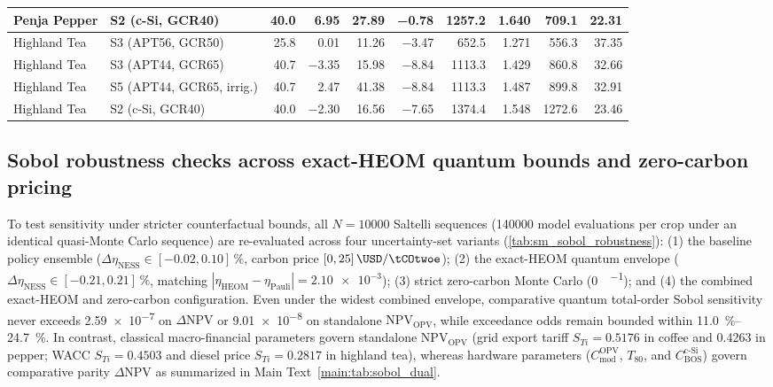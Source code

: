 \documentclass[preprint,12pt,a4paper]{elsarticle}
\begin{document}
\begin{table}[htbp]
{\begin{tabular}{@{}llrrrrrrrr@{}}
 Penja Pepper & S2 (c-Si, GCR40) & \num{40.0} & \num{+6.95} & \num{+27.89} & \num{-0.78} & \num{1257.2} & \num{1.640} & \num{709.1} & \num{22.31} \\
 \midrule
 Highland Tea & S3 (APT56, GCR50) & \num{25.8} & \num{+0.01} & \num{+11.26} & \num{-3.47} & \num{652.5} & \num{1.271} & \num{556.3} & \num{37.35} \\
 Highland Tea & S3 (APT44, GCR65) & \num{40.7} & \num{-3.35} & \num{+15.98} & \num{-8.84} & \num{1113.3} & \num{1.429} & \num{860.8} & \num{32.66} \\
 Highland Tea & S5 (APT44, GCR65, irrig.) & \num{40.7} & \num{+2.47} & \num{+41.38} & \num{-8.84} & \num{1113.3} & \num{1.487} & \num{899.8} & \num{32.91} \\
 Highland Tea & S2 (c-Si, GCR40) & \num{40.0} & \num{-2.30} & \num{+16.56} & \num{-7.65} & \num{1374.4} & \num{1.548} & \num{1272.6} & \num{23.46} \\
 \bottomrule
 \end{tabular}
 }
\end{table}

\subsection{Sobol robustness checks across exact-HEOM quantum bounds and zero-carbon pricing}
\label{sec:sm_sobol_robustness}

To test sensitivity under stricter counterfactual bounds, all $N=\num{10000}$ Saltelli sequences (\num{140000} model evaluations per crop under an identical quasi-Monte Carlo sequence) are re-evaluated across four uncertainty-set variants (\cref{tab:sm_sobol_robustness}): (1) the baseline policy ensemble ($\Delta\eta_{\mathrm{NESS}}\in[\num{-0.02},\num{+0.10}]\,\unit{\percent}$, carbon price $[\num{0},\num{25}]\,\unit{\USD\per\tCOtwoe}$); (2) the exact-HEOM quantum envelope ($\Delta\eta_{\mathrm{NESS}}\in[\num{-0.21},\num{+0.21}]\,\unit{\percent}$, matching $|\eta_{\mathrm{HEOM}}-\eta_{\mathrm{Pauli}}|=\num{2.10e-3}$); (3) strict zero-carbon Monte Carlo (\qty{0}{\USD\per\tCOtwoe}); and (4) the combined exact-HEOM and zero-carbon configuration. Even under the widest combined envelope, comparative quantum total-order Sobol sensitivity never exceeds \num{2.59e-7} on $\Delta\mathrm{NPV}$ or \num{9.01e-8} on standalone $\mathrm{NPV}_{\mathrm{OPV}}$, while exceedance odds remain bounded within \qtyrange{11.0}{24.7}{\percent}. In contrast, classical macro-financial parameters govern standalone $\mathrm{NPV}_{\mathrm{OPV}}$ (grid export tariff $S_{Ti}=\num{0.5176}$ in coffee and \num{0.4263} in pepper; WACC $S_{Ti}=\num{0.4503}$ and diesel price $S_{Ti}=\num{0.2817}$ in highland tea), whereas hardware parameters ($C_{\mathrm{mod}}^{\mathrm{OPV}}$, $T_{80}$, and $C_{\mathrm{BOS}}^{\mathrm{c\text{-}Si}}$) govern comparative parity $\Delta\mathrm{NPV}$ as summarized in Main Text~\cref{main:tab:sobol_dual}.
\end{document}
